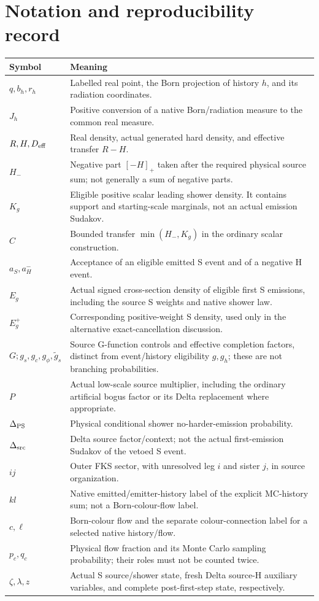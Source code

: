 \section{Notation and reproducibility record}
\label{sec:notation}
\begin{longtable}{p{}p{}}
\toprule
Symbol & Meaning\\\midrule\endhead
$q,b_h,r_h$ & Labelled real point, the Born projection of history $h$, and its radiation coordinates.\\
$J_h$ & Positive conversion of a native Born/radiation measure to the common real measure.\\
$R,H,D_{\rm eff}$ & Real density, actual generated hard density, and effective transfer $R-H$.\\
$H_-$ & Negative part $[-H]_+$ taken after the required physical source sum; not generally a sum of negative parts.\\
$K_g$ & Eligible positive scalar leading shower density. It contains support and starting-scale marginals, not an actual emission Sudakov.\\
$C$ & Bounded transfer $\min(H_-,K_g)$ in the ordinary scalar construction.\\
$a_S,a_H^-$ & Acceptance of an eligible emitted S event and of a negative H event.\\
$E_g$ & Actual signed cross-section density of eligible first S emissions, including the source S weights and native shower law.\\
$E_g^+$ & Corresponding positive-weight S density, used only in the alternative exact-cancellation discussion.\\
$G;g_s,g_c,g_\phi,\widetilde g_s$ & Source G-function controls and effective completion factors, distinct from event/history eligibility $g,g_h$; these are not branching probabilities.\\
$P$ & Actual low-scale source multiplier, including the ordinary artificial bogus factor or its Delta replacement where appropriate.\\
$\Delta_{\rm PS}$ & Physical conditional shower no-harder-emission probability.\\
$\Delta_{\rm src}$ & Delta source factor/context; not the actual first-emission Sudakov of the vetoed S event.\\
$ij$ & Outer FKS sector, with unresolved leg $i$ and sister $j$, in source organization.\\
$kl$ & Native emitted/emitter-history label of the explicit MC-history sum; not a Born-colour-flow label.\\
$c,\ell$ & Born-colour flow and the separate colour-connection label for a selected native history/flow.\\
$p_c,q_c$ & Physical flow fraction and its Monte Carlo sampling probability; their roles must not be counted twice.\\
$\zeta,\lambda,z$ & Actual S source/shower state, fresh Delta source-H auxiliary variables, and complete post-first-step state, respectively.\\
\bottomrule
\end{longtable}

